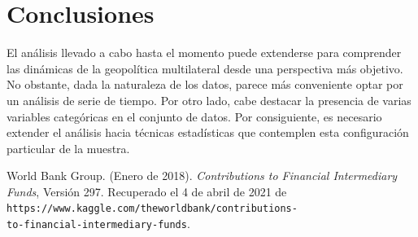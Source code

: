 \documentclass[11pt,letterpaper]{article}
\begin{document}
\section{Conclusiones}
El análisis llevado a cabo hasta el momento puede extenderse para comprender las dinámicas de la geopolítica multilateral desde una perspectiva más objetivo. No obstante, dada la naturaleza de los datos, parece más conveniente optar por un análisis de serie de tiempo. Por otro lado, cabe destacar la presencia de varias variables categóricas en el conjunto de datos. Por consiguiente, es necesario extender el análisis hacia técnicas estadísticas que contemplen esta configuración particular de la muestra.

\begin{thebibliography}{9}

World Bank Group. (Enero de 2018). \textit{Contributions to Financial Intermediary Funds}, Versión 297. Recuperado el 4 de abril de 2021 de {\tt https://www.kaggle.com/theworldbank/contributions-\\to-financial-intermediary-funds}.
\end{thebibliography}
	
\end{document}
